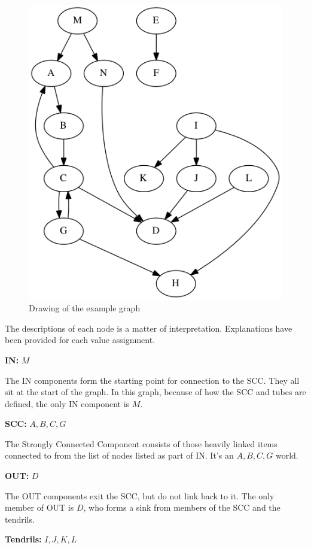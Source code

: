\documentclass[letterpaper,11pt]{article}
\begin{document}
\begin{figure}
\includegraphics[scale=0.5]{work/q3.png}
\caption{Drawing of the example graph}
\label{fig:q3graph}
\end{figure}

The descriptions of each node is a matter of interpretation.  Explanations have been provided for each value assignment.

\textbf{IN:}  $M$

The IN components form the starting point for connection to the SCC\cite{broder2000}.  They all sit at the start of the graph.  In this graph, because of how the SCC and tubes are defined, the only IN component is $M$.

\textbf{SCC:}  $A, B, C, G$

The Strongly Connected Component consists of those heavily linked items connected to from the list of nodes listed as part of IN\cite{broder2000}.  It's an $A, B, C, G$ world.

\textbf{OUT:}  $D$

The OUT components exit the SCC, but do not link back to it\cite{broder2000}.  The only member of OUT is $D$, who forms a sink from members of the SCC and the tendrils.

\textbf{Tendrils:}  $I, J, K, L$
\end{document}
